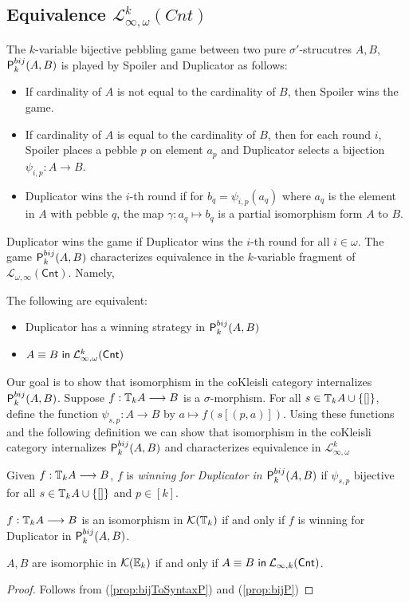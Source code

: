 \subsection{Equivalence $\mathcal{L}^{k}_{\infty,\omega}(Cnt)$}
The $k$-variable bijective pebbling game between two pure $\sigma'$-strucutres $A,B$, ${\mathsf{P}^{bij}_{k}(A,B)}$ is played by Spoiler and Duplicator as follows:
\begin{itemize}
\item If cardinality of $A$ is not equal to the cardinality of $B$, then Spoiler wins the game.
\item If cardinality of $A$ is equal to the cardinality of $B$, then for each round $i$, Spoiler places a pebble $p$ on element $a_{p}$ and Duplicator selects a bijection $\psi_{i,p}:A \longrightarrow B$. 
\item Duplicator wins the $i$-th round if for $b_{q} = \psi_{i,p}(a_{q})$ where $a_{q}$ is the element in $A$ with pebble $q$, the map $\gamma:a_{q} \mapsto b_{q}$ is a partial isomorphism form $A$ to $B$. 
\end{itemize}
Duplicator wins the game if Duplicator wins the $i$-th round for all $i \in \omega$. The game ${\mathsf{P}^{bij}_{k}(A,B)}$ characterizes equivalence in the $k$-variable fragment of $\mathcal{L}_{\omega,\infty}(\mathsf{Cnt})$. Namely,
\begin{prop}
The following are equivalent:
\begin{itemize}
\item Duplicator has a winning strategy in ${\mathsf{P}^{bij}_{k}(A,B)}$
\item ${A \equiv B \ \mathsf{in}\: \mathcal{L}^{k}_{\infty,\omega}(\mathsf{Cnt})}$
\end{itemize}
\label{prop:bijToSyntaxP}
\end{prop}
Our goal is to show that isomorphism in the coKleisli category internalizes ${\mathsf{P}^{bij}_{k}(A,B)}$. Suppose $f:{\mathbb{T}_{k}A} \longrightarrow B$ is a $\sigma$-morphism. For all $s \in {\mathbb{T}_{k}A} \cup \{[]\}$, define the function $\psi_{s,p}:A \longrightarrow B$ by $a \mapsto f(s[(p,a)])$. Using these functions and the following definition we can show that isomorphism in the coKleisli category internalizes ${\mathsf{P}^{bij}_{k}(A,B)}$ and characterizes equivalence in $\mathcal{L}^{k}_{\infty,\omega}$   
\begin{defn}
Given $f:{\mathbb{T}_{k}A} \longrightarrow B$, $f$ is \textit{winning for Duplicator in ${\mathsf{P}^{bij}_{k}(A,B)}$} if $\psi_{s,p}$ bijective for all $s \in {\mathbb{T}_{k}A} \cup \{[]\}$ and $p \in [k]$.  
\end{defn}
\begin{prop}
$f:{\mathbb{T}_{k}A} \longrightarrow B$ is an isomorphism in $\mathcal{K}({\mathbb{T}_{k}})$ if and only if $f$ is winning for Duplicator in ${\mathsf{P}^{bij}_{k}(A,B)}$.
\begin{cor}
$A,B$ are isomorphic in $\mathcal{K}({\mathbb{E}_{k}})$ if and only if ${A \equiv B \ \mathsf{in}\: \mathcal{L}_{\infty,k}(\mathsf{Cnt})}$.
\begin{proof}
Follows from (\ref{prop:bijToSyntaxP}) and (\ref{prop:bijP})
\end{proof}
\end{cor}
\label{prop:bijP}
\end{prop}
